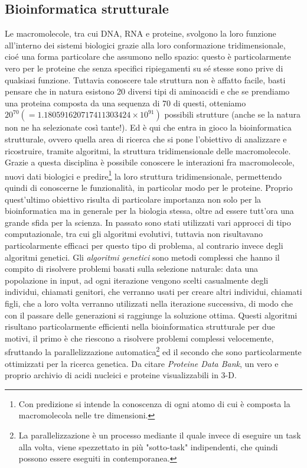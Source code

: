 \subsection{Bioinformatica strutturale}
Le macromolecole, tra cui DNA, RNA e proteine, svolgono la loro funzione all'interno dei sistemi biologici grazie alla loro conformazione tridimensionale, cioé una forma particolare che assumono nello spazio: questo è particolarmente vero per le proteine che senza specifici ripiegamenti su sé stesse sono prive di qualsiasi funzione. Tuttavia conoscere tale struttura non è affatto facile, basti pensare che in natura esistono 20 diversi tipi di aminoacidi e che se prendiamo una proteina composta da una sequenza di 70 di questi, otteniamo $20^{70}(=1.180591620717411303424\times{10^{91}})$ possibili strutture (anche se la natura non ne ha selezionate  così tante!). Ed è qui che entra in gioco la bioinformatica strutturale, ovvero quella area di ricerca che si pone l'obiettivo di analizzare e ricostruire, tramite algoritmi, la struttura tridimensionale delle macromolecole.
\newline
Grazie a questa disciplina è possibile conoscere le interazioni fra macromolecole, nuovi dati biologici e predire\footnote{Con predizione si intende la conoscenza di ogni atomo di cui è composta la macromolecola nelle tre dimensioni.} la loro struttura tridimensionale, permettendo quindi di conoscerne le funzionalità, in particolar modo per le proteine. Proprio quest'ultimo obiettivo risulta di particolare importanza non solo per la bioinformatica ma in generale per la biologia stessa, oltre ad essere tutt'ora una grande sfida per la scienza.
\newline
In passato sono stati utilizzati vari approcci di tipo computazionale, tra cui gli algoritmi evolutivi, tuttavia non risultavano particolarmente efficaci per questo tipo di problema, al contrario invece degli algoritmi genetici.
\newline
Gli \textit{algoritmi genetici} sono metodi complessi che hanno il compito di risolvere problemi basati sulla selezione naturale: data una popolazione in input, ad ogni iterazione vengono scelti casualmente degli individui, chiamati genitori, che verranno usati per creare altri individui, chiamati figli, che a loro volta verranno utilizzati nella iterazione successiva, di modo che con il passare delle generazioni si raggiunge la soluzione ottima.
\newline
Questi algoritmi risultano particolarmente efficienti nella bioinformatica strutturale per due motivi, il primo è che riescono a risolvere problemi complessi velocemente, sfruttando la parallelizzazione automatica\footnote{La parallelizzazione è un processo mediante il quale invece di eseguire un task alla volta, viene spezzettato in più "sotto-task" indipendenti, che quindi possono essere eseguiti in contemporanea.} ed il secondo che sono particolarmente ottimizzati per la ricerca genetica.
\newline
Da citare \textit{Proteine Data Bank}\cite{proteineDataBank}, un vero e proprio archivio di acidi nucleici e proteine visualizzabili in 3-D.


